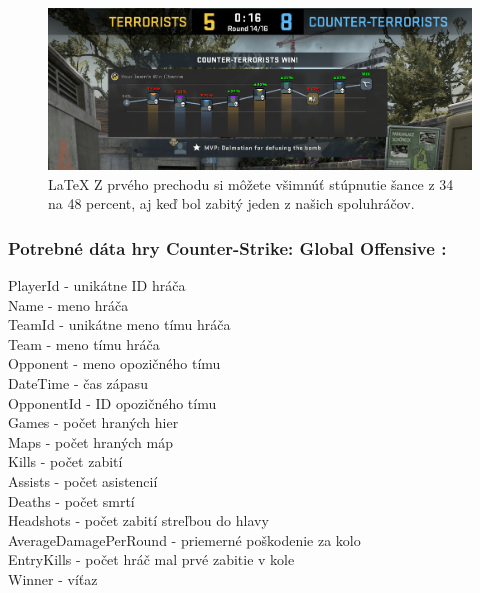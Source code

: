 \begin{figure}[h!]
	\includegraphics[width=.9\textwidth]{figures/osempat}
	\centering
	\caption{\LaTeX{} Z prvého prechodu si môžete všimnúť stúpnutie šance z 34 na 48 percent, aj keď bol zabitý jeden z našich spoluhráčov. 
		\label{osempat}}
\end{figure}

\subsubsection{Potrebné dáta hry Counter-Strike: Global Offensive :}

 
 PlayerId - unikátne ID hráča \\
 Name - meno hráča \\
 TeamId - unikátne meno tímu hráča \\
 Team - meno tímu hráča \\
 Opponent - meno opozičného tímu \\
 DateTime - čas zápasu \\
 OpponentId - ID opozičného tímu \\
 Games - počet hraných hier\\
 Maps - počet hraných máp\\
 Kills - počet zabití\\
 Assists - počet asistencií\\
 Deaths - počet smrtí\\
 Headshots - počet zabití streľbou do hlavy\\
 AverageDamagePerRound - priemerné poškodenie za kolo\\
 EntryKills - počet hráč mal prvé zabitie v kole\\
 Winner - víťaz

 

